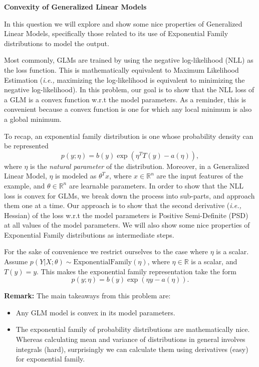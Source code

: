 \clearpage
\item {} {\bf Convexity of Generalized Linear Models}

In this question we will explore and show some nice properties of Generalized
Linear Models, specifically those related to its use of Exponential Family
distributions to model the output.

Most commonly, GLMs are trained by using the negative log-likelihood (NLL) as
the loss function. This is mathematically equivalent to Maximum Likelihood
Estimation (\emph{i.e.,} maximizing the log-likelihood is equivalent to
minimizing the negative log-likelihood). In this problem, our goal is to show
that the NLL loss of a GLM is a convex function w.r.t the model parameters. As
a reminder, this is convenient because a convex function is one for which any
local minimum is also a global minimum.

To recap, an exponential family distribution is one whose probability density
can be represented
%
\begin{equation*}
    p(y; \eta) = b(y)\exp(\eta^TT(y) - a(\eta)),
\end{equation*}
%
where $\eta$ is the \emph{natural parameter} of the distribution. Moreover, in
a Generalized Linear Model, $\eta$ is modeled as $\theta^Tx$, where $x \in
\mathbb{R}^n$ are the input features of the example, and $\theta \in
\mathbb{R}^n$ are learnable parameters. In order to show that the NLL loss is
convex for GLMs, we break down the process into sub-parts, and approach them
one at a time. Our approach is to show that the second derivative (\emph{i.e.,}
Hessian) of the loss w.r.t the model parameters is Positive Semi-Definite (PSD)
at all values of the model parameters. We will also show some nice properties
of Exponential Family distributions as intermediate steps.

For the sake of convenience we restrict ourselves to the case where $\eta$ is
a scalar. Assume $p(Y|X;\theta )\sim \text{ExponentialFamily}(\eta)$, where
$\eta \in\mathbb{R}$ is a scalar, and $T(y) = y$. This makes the exponential
family representation take the form
%
\begin{equation*}
    p(y ; \eta) = b(y)\exp(\eta y - a(\eta)).
\end{equation*}
%
\begin{enumerate}
    
    
    
\end{enumerate}

\textbf{Remark:} The main takeaways from this problem are:
\begin{itemize}
  \item Any GLM model is convex in its model parameters.
  \item The exponential family of probability distributions are mathematically
  nice. Whereas calculating mean and variance of distributions in general
  involves integrals (hard), surprisingly we can calculate them using
  derivatives (easy) for exponential family.
\end{itemize}
